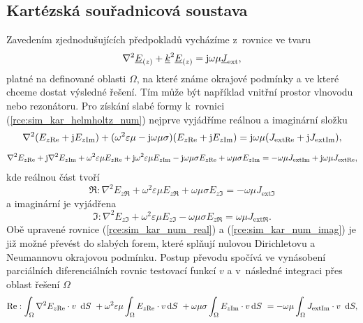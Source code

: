 \subsection{Kartézská souřadnicová soustava} \label{subsec:sim_kar}
Zavedením zjednodušujících předpokladů vycházíme z~rovnice ve tvaru
\begin{equation}
	\nabla^{2}{\underline{E}}_{(z)} +{\underline{k}}^{2}{\underline{E}}_{(z)} = \mathrm{j}\omega\mu{\underline{J}}_{\mathrm{ext}},
	\label{rce:sim_kar_helmholtz_num} 
\end{equation}
platné na definované oblasti $\Omega$, na které známe okrajové podmínky a ve které chceme dostat výsledné řešení. Tím může být například vnitřní prostor vlnovodu nebo rezonátoru. Pro získání slabé formy k~rovnici (\ref{rce:sim_kar_helmholtz_num}) nejprve vyjádříme reálnou a imaginární složku
\begin{displaymath}
	\nabla^{2}(E_{z\mathrm{Re}} + \mathrm{j} E_{z\mathrm{Im}}) + (\omega^{2}\varepsilon\mu - \mathrm{j}\omega\mu\sigma)(E_{z\mathrm{Re}} + \mathrm{j} E_{z\mathrm{Im}}) = \mathrm{j}\omega\mu (J_{\mathrm{ext}\mathrm{Re}} + \mathrm{j} J_{\mathrm{ext}\mathrm{Im}}),
\end{displaymath}
\begin{displaymath}
	\nabla^{2} E_{z\mathrm{Re}} + \mathrm{j}\nabla^{2} E_{z\mathrm{Im}} + \omega^{2}\varepsilon\mu E_{z\mathrm{Re}} + \mathrm{j}\omega^{2}\varepsilon\mu E_{z\mathrm{Im}} - \mathrm{j}\omega\mu\sigma E_{z\mathrm{Re}} + \omega\mu\sigma E_{z\mathrm{Im}} = - \omega\mu J_{\mathrm{ext}\mathrm{Im}} + \mathrm{j}\omega\mu J_{\mathrm{ext}\mathrm{Re}},
\end{displaymath}
kde reálnou část tvoří
\begin{equation}
	\Re : \nabla^{2} E_{z\Re} + \omega^{2}\varepsilon\mu E_{z\Re} + \omega\mu\sigma E_{z\Im} = - \omega\mu J_{\mathrm{ext}\Im}
	\label{rce:sim_kar_num_real} 
\end{equation}
a imaginární je vyjádřena
\begin{equation}
	\Im : \nabla^{2} E_{z\Im} + \omega^{2}\varepsilon\mu E_{z\Im} - \omega\mu\sigma E_{z\Re} = \omega\mu J_{\mathrm{ext}\Re}.
	\label{rce:sim_kar_num_imag} 
\end{equation}
Obě upravené rovnice (\ref{rce:sim_kar_num_real}) a (\ref{rce:sim_kar_num_imag}) je již možné převést do slabých forem, které splňují nulovou Dirichletovu a Neumannovu okrajovou podmínku. Postup převodu spočívá ve vynásobení parciálních diferenciálních rovnic testovací funkcí $v$ a v~následné integraci přes oblast řešení $\Omega$ 
\begin{equation}
	\mathrm{Re} : \int_{\Omega}\nabla^{2} E_{z\mathrm{Re}}\cdot v~\,\mathrm{d} S~+ \omega^{2}\varepsilon\mu\int_{\Omega} E_{z\mathrm{Re}}\cdot v\,\mathrm{d} S~+ \omega\mu\sigma\int_{\Omega} E_{z\mathrm{Im}}\cdot v\,\mathrm{d} S~= - \omega\mu \int_{\Omega}J_{\mathrm{ext}\mathrm{Im}}\cdot v~\,\mathrm{d} S,
	\label{rce:sim_kar_weak_odv_real} 
\end{equation}
